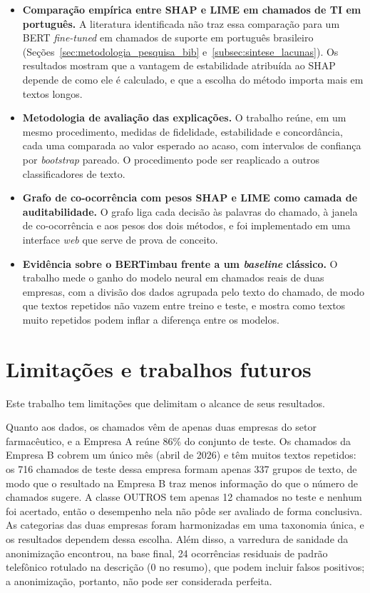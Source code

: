 \documentclass[
    12pt,                %
    openright,           %
    oneside,             %
    a4paper,             %
    english,             %
    brazil               %
]{abntex2}
\begin{document}
\begin{itemize}
    \item \textbf{Comparação empírica entre SHAP e LIME em chamados de TI em português.} A literatura identificada não traz essa comparação para um BERT \textit{fine-tuned} em chamados de suporte em português brasileiro (Seções~\ref{sec:metodologia_pesquisa_bib} e~\ref{subsec:sintese_lacunas}). Os resultados mostram que a vantagem de estabilidade atribuída ao SHAP depende de como ele é calculado, e que a escolha do método importa mais em textos longos.
 
    \item \textbf{Metodologia de avaliação das explicações.} O trabalho reúne, em um mesmo procedimento, medidas de fidelidade, estabilidade e concordância, cada uma comparada ao valor esperado ao acaso, com intervalos de confiança por \textit{bootstrap} pareado. O procedimento pode ser reaplicado a outros classificadores de texto.
 
    \item \textbf{Grafo de co-ocorrência com pesos SHAP e LIME como camada de auditabilidade.} O grafo liga cada decisão às palavras do chamado, à janela de co-ocorrência e aos pesos dos dois métodos, e foi implementado em uma interface \textit{web} que serve de prova de conceito.
 
    \item \textbf{Evidência sobre o BERTimbau frente a um \textit{baseline} clássico.} O trabalho mede o ganho do modelo neural em chamados reais de duas empresas, com a divisão dos dados agrupada pelo texto do chamado, de modo que textos repetidos não vazem entre treino e teste, e mostra como textos muito repetidos podem inflar a diferença entre os modelos.
\end{itemize}

\section{Limitações e trabalhos futuros}
\label{sec:limitacoes}
Este trabalho tem limitações que delimitam o alcance de seus resultados.

Quanto aos dados, os chamados vêm de apenas duas empresas do setor farmacêutico, e a Empresa A reúne 86\% do conjunto de teste. Os chamados da Empresa B cobrem um único mês (abril de 2026) e têm muitos textos repetidos: os 716 chamados de teste dessa empresa formam apenas 337 grupos de texto, de modo que o resultado na Empresa B traz menos informação do que o número de chamados sugere. A classe OUTROS tem apenas 12 chamados no teste e nenhum foi acertado, então o desempenho nela não pôde ser avaliado de forma conclusiva. As categorias das duas empresas foram harmonizadas em uma taxonomia única, e os resultados dependem dessa escolha. Além disso, a varredura de sanidade da anonimização encontrou, na base final, 24 ocorrências residuais de padrão telefônico rotulado na descrição (0 no resumo), que podem incluir falsos positivos; a anonimização, portanto, não pode ser considerada perfeita.
\end{document}
